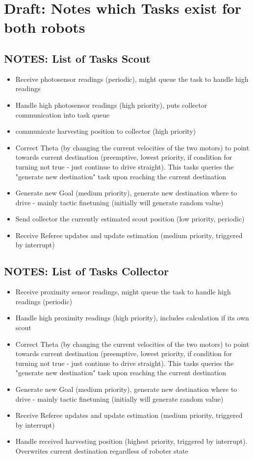 \documentclass[12pt]{article}
\begin{document}
\lstset{language=C++}

\section*{Draft: Notes which Tasks exist for both robots}

\subsection*{NOTES: List of Tasks Scout}
\begin{itemize}
  \item Receive photosensor readings (periodic), might queue the task to handle high readings
  \item Handle high photosensor readings (high priority), puts collector communication into task queue
  \item communicate harvesting position to collector (high priority)
  \item Correct Theta (by changing the current velocities of the two motors) to point towards current destination (preemptive, lowest priority, if condition for turning not true - just continue to drive straight). This tasks queries the "generate new destination" task upon reaching the current destination
  \item Generate new Goal (medium priority), generate new destination where to drive - mainly tactic finetuning (initially will generate random value)
  \item Send collector the currently estimated scout position (low priority, periodic)
  \item Receive Referee updates and update estimation (medium priority, triggered by interrupt)
\end{itemize}

\subsection*{NOTES: List of Tasks Collector}
\begin{itemize}
  \item Receive proximity sensor readings, might queue the task to handle high readings (periodic)
  \item Handle high proximity readings (high priority), includes calculation if its own scout
  \item Correct Theta (by changing the current velocities of the two motors) to point towards current destination (preemptive, lowest priority, if condition for turning not true - just continue to drive straight). This tasks queries the "generate new destination" task upon reaching the current destination
  \item Generate new Goal (medium priority), generate new destination where to drive - mainly tactic finetuning (initially will generate random value)
  \item Receive Referee updates and update estimation (medium priority, triggered by interrupt)
  \item Handle received harvesting position (highest priority, triggered by interrupt). Overwrites current destination regardless of roboter state
\end{itemize}
\end{document}
